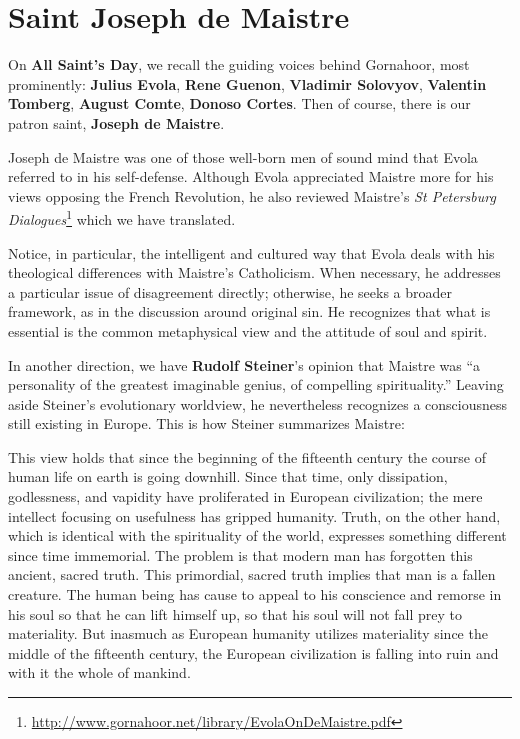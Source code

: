 \section{Saint Joseph de Maistre}

On \textbf{All Saint's Day}, we recall the guiding voices behind Gornahoor, most prominently: \textbf{Julius Evola}, \textbf{Rene Guenon}, \textbf{Vladimir Solovyov}, \textbf{Valentin Tomberg},
\textbf{August Comte}, \textbf{Donoso Cortes}. Then of course, there is our patron saint, \textbf{Joseph de Maistre}.

Joseph de Maistre was one of those well-born men of sound mind that Evola referred to in his self-defense. Although Evola appreciated Maistre more for his views opposing the French Revolution, he also reviewed Maistre's \textit{St Petersburg Dialogues}\footnote{\url{http://www.gornahoor.net/library/EvolaOnDeMaistre.pdf}} which we have translated.

Notice, in particular, the intelligent and cultured way that Evola deals with his theological differences with Maistre's Catholicism. When necessary, he addresses a particular issue of disagreement directly; otherwise, he seeks a broader framework, as in the discussion around original sin. He recognizes that what is essential is the common metaphysical view and the attitude of soul and spirit.

In another direction, we have \textbf{Rudolf Steiner}'s opinion that Maistre was ``a personality of the greatest imaginable genius, of compelling spirituality.'' Leaving aside Steiner's evolutionary worldview, he nevertheless recognizes a consciousness still existing in Europe. This is how Steiner summarizes Maistre:

\begin{quotex}
This view holds that since the beginning of the fifteenth century the course of human life on earth is going downhill. Since that time, only dissipation, godlessness, and vapidity have proliferated in European civilization; the mere intellect focusing on usefulness has gripped humanity. Truth, on the other hand, which is identical with the spirituality of the world, expresses something different since time immemorial. The problem is that modern man has forgotten this ancient, sacred truth. This primordial, sacred truth implies that man is a fallen creature. The human being has cause to appeal to his conscience and remorse in his soul so that he can lift himself up, so that his soul will not fall prey to materiality. But inasmuch as European humanity utilizes materiality since the middle of the fifteenth century, the European civilization is falling into ruin and with it the whole of mankind.
\end{quotex}


